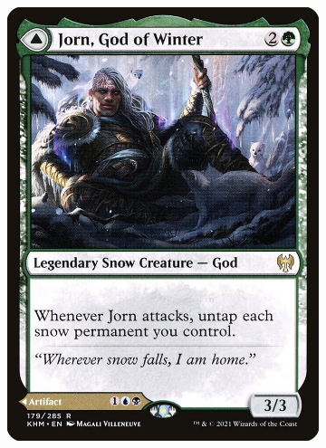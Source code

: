 \begin{figure}[ht]
	\centering
	\begin{subfigure}{0.25\textwidth}
		\includegraphics[width=1.0\textwidth]{Immagini/khm-179-jorn-god-of-winter.jpg}
	\end{subfigure}%
	\begin{subfigure}{0.25\textwidth}

\end{subfigure}
\end{figure}
